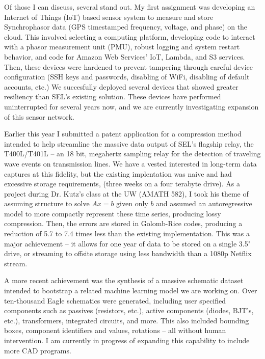 \documentclass[letterpaper]{article}
\begin{document}
Of those I can discuss, several stand out. My first assignment was developing an Internet
of Things (IoT) based sensor system to measure and store Synchrophasor data (GPS timestamped
frequency, voltage, and phase) on the cloud. This involved selecting a computing platform,
developing code to interact with a phasor measurement unit (PMU), robust logging and
system restart behavior, and code for Amazon Web Services' IoT, Lambda, and S3
services. Then, these devices were hardened to prevent tampering through
careful device configuration (SSH keys and passwords, disabling of WiFi, disabling
of default accounts, etc.) We succesfully deployed several devices that showed greater
resiliency than SEL's existing solution. These devices have performed uninterrupted for
several years now, and we are currently investigating expansion of this sensor network.

Earlier this year I submitted a patent application for a compression method intended
to help streamline the massive data output of SEL's flagship relay, the T400L/T401L -- an
18 bit, megahertz sampling relay for the detection of traveling wave events on
transmission lines. We have a vested interested in long-term data captures at this
fidelity, but the existing implentation was naive and had excessive storage requirements,
(three weeks on a four terabyte drive). As a project during Dr. Kutz's class at the UW
(AMATH 582), I took his theme of assuming structure to solve $Ax=b$ given only $b$ and
assumed an autoregressive model to more compactly represent these time series,
producing lossy compression. Then, the errors are stored in Golomb-Rice codes, producing
a reduction of 5.7 to 7.4 times less than the existing implementation. This was a
major achievement -- it allows for one year of data to be stored on a single 3.5"
drive, or streaming to offsite storage using less bandwidth than a 1080p Netflix stream.

A more recent achievement was the synthesis of a massive schematic dataset intended to
bootstrap a related machine learning model we are working on. Over ten-thousand Eagle
schematics were generated, including user specified components such as passives
(resistors, etc.), active components (diodes, BJT's, etc.), transformers, integrated
circuits, and more. This also included bounding boxes, component identifiers and values,
rotations -- all without human intervention. I am currently in progress of expanding
this capability to include more CAD programs.
\end{document}
